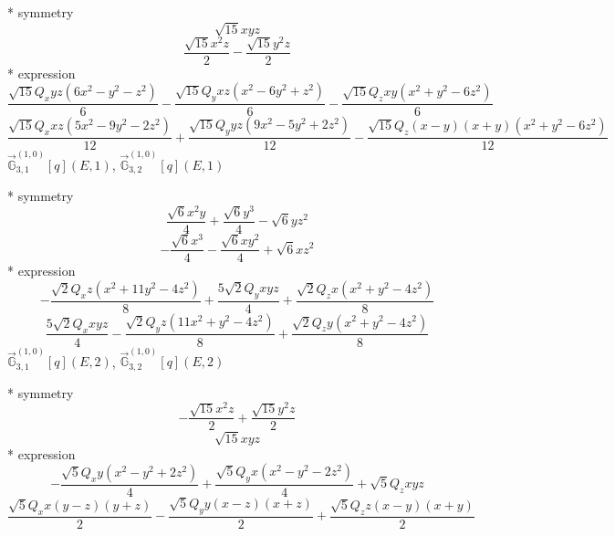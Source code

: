 \documentclass[fleqn,8pt]{jsarticle}
\begin{document}
\noindent\quad ** symmetry
\begin{dmath*}
\sqrt{15} x y z
\end{dmath*}
\begin{dmath*}
\frac{\sqrt{15} x^{2} z}{2} - \frac{\sqrt{15} y^{2} z}{2}
\end{dmath*}
\noindent\quad ** expression
\begin{dmath*}
\frac{\sqrt{15} Q_{x} y z \left(6 x^{2} - y^{2} - z^{2}\right)}{6} - \frac{\sqrt{15} Q_{y} x z \left(x^{2} - 6 y^{2} + z^{2}\right)}{6} - \frac{\sqrt{15} Q_{z} x y \left(x^{2} + y^{2} - 6 z^{2}\right)}{6}
\end{dmath*}
\begin{dmath*}
\frac{\sqrt{15} Q_{x} x z \left(5 x^{2} - 9 y^{2} - 2 z^{2}\right)}{12} + \frac{\sqrt{15} Q_{y} y z \left(9 x^{2} - 5 y^{2} + 2 z^{2}\right)}{12} - \frac{\sqrt{15} Q_{z} \left(x - y\right) \left(x + y\right) \left(x^{2} + y^{2} - 6 z^{2}\right)}{12}
\end{dmath*}
\noindent\quad $\vec{\mathbb{G}}_{3,1}^{(1,0)}[q](E,1)$, $\vec{\mathbb{G}}_{3,2}^{(1,0)}[q](E,1)$

\noindent\quad ** symmetry
\begin{dmath*}
\frac{\sqrt{6} x^{2} y}{4} + \frac{\sqrt{6} y^{3}}{4} - \sqrt{6} y z^{2}
\end{dmath*}
\begin{dmath*}
- \frac{\sqrt{6} x^{3}}{4} - \frac{\sqrt{6} x y^{2}}{4} + \sqrt{6} x z^{2}
\end{dmath*}
\noindent\quad ** expression
\begin{dmath*}
- \frac{\sqrt{2} Q_{x} z \left(x^{2} + 11 y^{2} - 4 z^{2}\right)}{8} + \frac{5 \sqrt{2} Q_{y} x y z}{4} + \frac{\sqrt{2} Q_{z} x \left(x^{2} + y^{2} - 4 z^{2}\right)}{8}
\end{dmath*}
\begin{dmath*}
\frac{5 \sqrt{2} Q_{x} x y z}{4} - \frac{\sqrt{2} Q_{y} z \left(11 x^{2} + y^{2} - 4 z^{2}\right)}{8} + \frac{\sqrt{2} Q_{z} y \left(x^{2} + y^{2} - 4 z^{2}\right)}{8}
\end{dmath*}
\noindent\quad $\vec{\mathbb{G}}_{3,1}^{(1,0)}[q](E,2)$, $\vec{\mathbb{G}}_{3,2}^{(1,0)}[q](E,2)$

\noindent\quad ** symmetry
\begin{dmath*}
- \frac{\sqrt{15} x^{2} z}{2} + \frac{\sqrt{15} y^{2} z}{2}
\end{dmath*}
\begin{dmath*}
\sqrt{15} x y z
\end{dmath*}
\noindent\quad ** expression
\begin{dmath*}
- \frac{\sqrt{5} Q_{x} y \left(x^{2} - y^{2} + 2 z^{2}\right)}{4} + \frac{\sqrt{5} Q_{y} x \left(x^{2} - y^{2} - 2 z^{2}\right)}{4} + \sqrt{5} Q_{z} x y z
\end{dmath*}
\begin{dmath*}
\frac{\sqrt{5} Q_{x} x \left(y - z\right) \left(y + z\right)}{2} - \frac{\sqrt{5} Q_{y} y \left(x - z\right) \left(x + z\right)}{2} + \frac{\sqrt{5} Q_{z} z \left(x - y\right) \left(x + y\right)}{2}
\end{dmath*}
\end{document}
